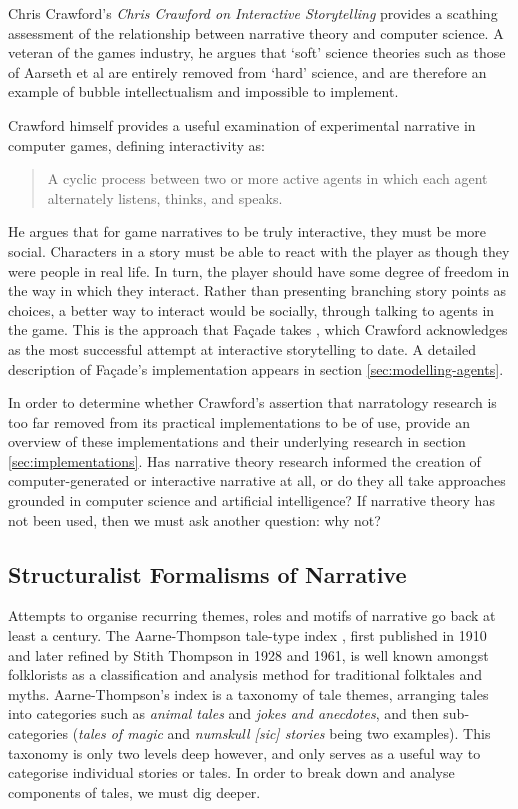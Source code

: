 Chris Crawford's \emph{Chris Crawford on Interactive Storytelling} \citep{crawford2012chris} provides a scathing assessment of the relationship between narrative theory and computer science. A veteran of the games industry, he argues that `soft' science theories such as those of Aarseth et al are entirely removed from `hard' science, and are therefore an example of bubble intellectualism and impossible to implement. 

Crawford himself provides a useful examination of experimental narrative in computer games, defining interactivity as:

\begin{quote}
A cyclic process between two or more active agents in which each agent alternately listens, thinks, and speaks.
\end{quote}

He argues that for game narratives to be truly interactive, they must be more social. Characters in a story must be able to react with the player as though they were people in real life. In turn, the player should have some degree of freedom in the way in which they interact. Rather than presenting branching story points as choices, a better way to interact would be socially, through talking to agents in the game. This is the approach that Fa\c{c}ade takes \citep{mateas2003faccade}, which Crawford acknowledges as the most successful attempt at interactive storytelling to date. A detailed description of Fa\c{c}ade's implementation appears in section \ref{sec:modelling-agents}.

In order to determine whether Crawford's assertion that narratology research is
too far removed from its practical implementations to be of use, provide an
overview of these implementations and their underlying research in section \ref{sec:implementations}. Has narrative theory research informed the creation of computer-generated or interactive narrative at all, or do they all take approaches grounded in computer science and artificial intelligence? If narrative theory has not been used, then we must ask another question: why not?


\subsection{Structuralist Formalisms of Narrative}
Attempts to organise recurring themes, roles and motifs of narrative go back at least a century. The Aarne-Thompson tale-type index \citep{aarne1987types}, first published in 1910 and later refined by Stith Thompson in 1928 and 1961, is well known amongst folklorists as a classification and analysis method for traditional folktales and myths. Aarne-Thompson's index is a taxonomy of tale themes, arranging tales into categories such as \emph{animal tales} and \emph{jokes and anecdotes}, and then sub-categories (\emph{tales of magic} and \emph{numskull [sic] stories} being two examples). This taxonomy is only two levels deep however, and only serves as a useful way to categorise individual stories or tales. In order to break down and analyse components of tales, we must dig deeper.

